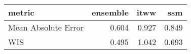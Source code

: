 
\begin{tabular}{lrrr}
\toprule
metric & ensemble & itww & ssm\\
\midrule
Mean Absolute Error & 0.604 & 0.927 & 0.849\\
WIS & 0.495 & 1.042 & 0.693\\
\bottomrule
\end{tabular}